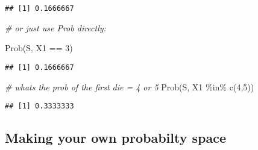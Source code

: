 \documentclass[
]{article}
\newenvironment{Shaded}{\begin{snugshade}}{\end{snugshade}}
\newcommand{\AttributeTok}[1]{\textcolor[rgb]{0.77,0.63,0.00}{#1}}
\newcommand{\CommentTok}[1]{\textcolor[rgb]{0.56,0.35,0.01}{\textit{#1}}}
\newcommand{\DecValTok}[1]{\textcolor[rgb]{0.00,0.00,0.81}{#1}}
\newcommand{\FunctionTok}[1]{\textcolor[rgb]{0.00,0.00,0.00}{#1}}
\newcommand{\NormalTok}[1]{#1}
\newcommand{\OtherTok}[1]{\textcolor[rgb]{0.56,0.35,0.01}{#1}}
\newcommand{\SpecialCharTok}[1]{\textcolor[rgb]{0.00,0.00,0.00}{#1}}
\begin{document}
\begin{verbatim}
## [1] 0.1666667
\end{verbatim}

\begin{Shaded}
\begin{Highlighting}[]
\CommentTok{\# or just use Prob directly:}

\FunctionTok{Prob}\NormalTok{(S, X1 }\SpecialCharTok{==} \DecValTok{3}\NormalTok{)}
\end{Highlighting}
\end{Shaded}

\begin{verbatim}
## [1] 0.1666667
\end{verbatim}

\begin{Shaded}
\begin{Highlighting}[]
\CommentTok{\# whats the prob of the first die = 4 or 5}
\FunctionTok{Prob}\NormalTok{(S, X1 }\SpecialCharTok{\%in\%} \FunctionTok{c}\NormalTok{(}\DecValTok{4}\NormalTok{,}\DecValTok{5}\NormalTok{))}
\end{Highlighting}
\end{Shaded}

\begin{verbatim}
## [1] 0.3333333
\end{verbatim}

\hypertarget{making-your-own-probabilty-space}{%
\subsection{Making your own probabilty
space}\label{making-your-own-probabilty-space}}

\begin{Shaded}
\end{Shaded}
\end{document}
